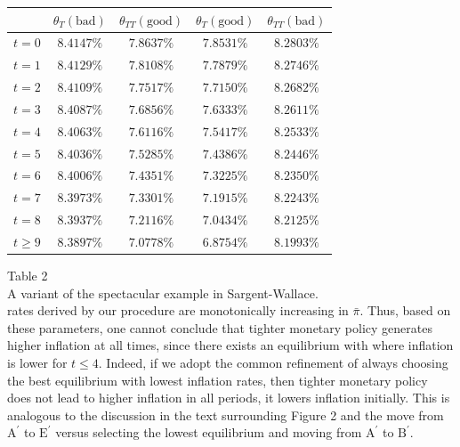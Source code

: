 \documentclass[10pt]{article}
\begin{document}
\begin{center}
\begin{tabular}{ccccc}
 & $\theta_{T}(\mathrm{bad})$ & $\theta_{T T}(\mathrm{good})$ & $\theta_{T}(\mathrm{good})$ & $\theta_{T T}(\mathrm{bad})$ \\
\hline\hline
$t=0$ & $8.4147 \%$ & $7.8637 \%$ & $7.8531 \%$ & $8.2803 \%$ \\
$t=1$ & $8.4129 \%$ & $7.8108 \%$ & $7.7879 \%$ & $8.2746 \%$ \\
$t=2$ & $8.4109 \%$ & $7.7517 \%$ & $7.7150 \%$ & $8.2682 \%$ \\
$t=3$ & $8.4087 \%$ & $7.6856 \%$ & $7.6333 \%$ & $8.2611 \%$ \\
$t=4$ & $8.4063 \%$ & $7.6116 \%$ & $7.5417 \%$ & $8.2533 \%$ \\
$t=5$ & $8.4036 \%$ & $7.5285 \%$ & $7.4386 \%$ & $8.2446 \%$ \\
$t=6$ & $8.4006 \%$ & $7.4351 \%$ & $7.3225 \%$ & $8.2350 \%$ \\
$t=7$ & $8.3973 \%$ & $7.3301 \%$ & $7.1915 \%$ & $8.2243 \%$ \\
$t=8$ & $8.3937 \%$ & $7.2116 \%$ & $7.0434 \%$ & $8.2125 \%$ \\
$t \geq 9$ & $8.3897 \%$ & $7.0778 \%$ & $6.8754 \%$ & $8.1993 \%$ \\
\end{tabular}
\end{center}

Table 2\\
A variant of the spectacular example in Sargent-Wallace.\\
rates derived by our procedure are monotonically increasing in $\bar{\pi}$. Thus, based on these parameters, one cannot conclude that tighter monetary policy generates higher inflation at all times, since there exists an equilibrium with where inflation is lower for $t \leq 4$. Indeed, if we adopt the common refinement of always choosing the best equilibrium with lowest inflation rates, then tighter monetary policy does not lead to higher inflation in all periods, it lowers inflation initially. This is analogous to the discussion in the text surrounding Figure 2 and the move from $\mathrm{A}^{\prime}$ to $\mathrm{E}^{\prime}$ versus selecting the lowest equilibrium and moving from $\mathrm{A}^{\prime}$ to $\mathrm{B}^{\prime}$.
\end{document}
